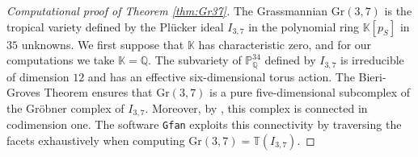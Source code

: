 \documentclass[12pt,a4paper]{amsart}
\theoremstyle{definition}
\newcommand{\K}{{\mathbb{K}}}
\newcommand{\Q}{{\mathbb{Q}}}
\newcommand{\PP}{{\mathbb{P}}}
\newcommand{\Gr}{{\mathrm{Gr}}}
\providecommand\Gfan{\texttt{Gfan}\xspace}
\providecommand{\tropical}[1]{{\mathbb{T}}(#1)}
\begin{document}
\begin{proof}[Computational proof of Theorem \ref{thm:Gr37}]
  The Grassmannian $\Gr(3,7)$ is the tropical variety defined by the
  Pl\"ucker ideal $I_{3,7}$ in the polynomial ring $\K[p_S]$ in $35$
  unknowns. We first suppose that $\K$ has characteristic zero, and
  for our computations we take $\K = \Q$.  The subvariety of
  $\PP^{34}_\Q$ defined by $I_{3,7}$ is irreducible of dimension $12$ and
  has an effective six-dimensional torus action. The Bieri-Groves
  Theorem \cite{BG} ensures that $\Gr(3,7)$ is a pure five-dimensional
  subcomplex of the Gr\"obner complex of $I_{3,7}$.  Moreover, by
  \cite[Theorem~3.1]{BJSST}, this complex is connected in codimension
  one.  The software \Gfan \cite{Gfan} exploits this connectivity by
  traversing the facets exhaustively when computing $\Gr(3,7) =
  \tropical{I_{3,7}}$.


\end{proof}
\end{document}
